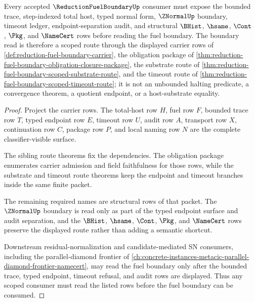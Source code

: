 \begin{theorem}
\label{thm:reduction-fuel-boundary-scoped-route}
Every accepted $\ReductionFuelBoundaryUp$ consumer must expose the bounded trace, step-indexed total host, typed normal form, $\ZNormalUp$ boundary, timeout ledger, endpoint-separation audit, and structural $\BHist$, $\hsame$, $\Cont$, $\Pkg$, and $\NameCert$ rows before reading the fuel boundary. The boundary read is therefore a scoped route through the displayed carrier rows of \autoref{def:reduction-fuel-boundary-carrier}, the obligation package of \autoref{thm:reduction-fuel-boundary-obligation-closure-package}, the substrate route of \autoref{thm:reduction-fuel-boundary-scoped-substrate-route}, and the timeout route of \autoref{thm:reduction-fuel-boundary-scoped-timeout-route}; it is not an unbounded halting predicate, a convergence theorem, a quotient endpoint, or a host-substrate equality.
\end{theorem}
\begin{proof}
Project the carrier rows. The total-host row $H$, fuel row $F$, bounded trace row $T$, typed endpoint row $E$, timeout row $U$, audit row $A$, transport row $X$, continuation row $C$, package row $P$, and local naming row $N$ are the complete classifier-visible surface.

The sibling route theorems fix the dependencies. The obligation package enumerates carrier admission and field faithfulness for those rows, while the substrate and timeout route theorems keep the endpoint and timeout branches inside the same finite packet.

The remaining required names are structural rows of that packet. The $\ZNormalUp$ boundary is read only as part of the typed endpoint surface and audit separation, and the $\BHist$, $\hsame$, $\Cont$, $\Pkg$, and $\NameCert$ rows preserve the displayed route rather than adding a semantic shortcut.

Downstream residual-normalization and candidate-mediated SN consumers, including the parallel-diamond frontier of \autoref{ch:concrete-instances-metacic-parallel-diamond-frontier-namecert}, may read the fuel boundary only after the bounded trace, typed endpoint, timeout refusal, and audit rows are displayed. Thus any scoped consumer must read the listed rows before the fuel boundary can be consumed.
\end{proof}


